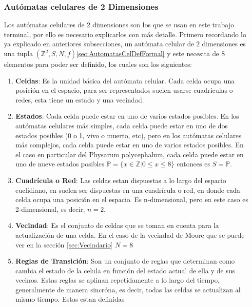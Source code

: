 \subsubsection{Aut\'omatas celulares de 2 Dimensiones}
\label{sec:AutomatasCel2D}

    Los aut\'omatas celulares de 2 dimensiones son los que se usan en este trabajo terminal, por ello es necesario
        explicarlos con m\'as detalle. Primero recordando lo ya explicado en anteriores subsecciones, un aut\'omata
        celular de 2 dimensiones es una tupla $({\mathbb{Z}^{2}},S,N,f)$\ref{sec:AutomatasCelDefFormal} y este 
        necesita de 8 elementos para poder ser definido, los cuales son los siguientes:         
    \begin{enumerate}
        \item \textbf{Celdas}: Es la unidad b\'asica del aut\'omata celular. Cada celda ocupa una posici\'on en el espacio, 
            para ser representados suelen usarse cuadr\'iculas o redes, esta tiene un estado y una vecindad.
        \item \textbf{Estados}: Cada celda puede estar en uno de varios estados posibles. En los aut\'omatas celulares
            m\'as simples, cada celda puede estar en uno de dos estados posibles (0 o 1, vivo o muerto, etc), pero en los 
            aut\'omatas celulares m\'as complejos, cada celda puede estar en uno de varios estados posibles. En el caso 
            en particular del Physarum polycephalum, cada celda puede estar en uno de nueve estados posibles 
            $\mathbb{P} = \{x \in \mathbb{Z}| 0 \leq x \leq 8\}$ entonces es $S = \mathbb{P}$.
        \item \textbf{Cuadr\'icula o Red}: Las celdas estan dispuestas a lo largo del espacio euclidiano, en 
            suelen ser dispuestas en una cuadr\'icula o red, en donde cada celda ocupa una posici\'on en el espacio. Es
            n-dimensional, pero en este caso es 2-dimensional, es decir, $n = 2$.
        \item \textbf{Vecindad}: Es el conjunto de celdas que se toman en cuenta para la actualizaci\'on de una celda. En el caso de
            la vecindad de Moore que se puede ver en la secci\'on \ref{sec:Vecindario} $N = 8$
        \item \textbf{Reglas de Transici\'on}: Son un conjunto de reglas que determinan como cambia el estado de la celula en 
            funci\'on del estado actual de ella y de sus vecinos. Estas reglas se aplinan repetidamente a lo largo del tiempo,
            generalmente de manera sincr\'ona, es decir, todas las celdas se actualizan al mismo tiempo. Estas estan definidas 

\end{enumerate}
